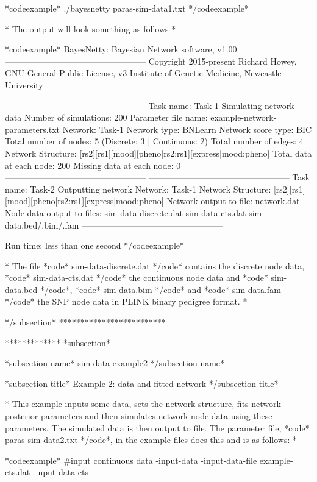 *codeexample* ./bayesnetty paras-sim-data1.txt */codeexample*

* The output will look something as follows *

*codeexample* BayesNetty: Bayesian Network software, v1.00 -------------------------------------------------- Copyright 2015-present Richard Howey, GNU General Public License, v3 Institute of Genetic Medicine, Newcastle University

-------------------------------------------------- Task name: Task-1 Simulating network data Number of simulations: 200 Parameter file name: example-network-parameters.txt Network: Task-1 Network type: BNLearn Network score type: BIC Total number of nodes: 5 (Discrete: 3 | Continuous: 2) Total number of edges: 4 Network Structure: [rs2][rs1][mood][pheno|rs2:rs1][express|mood:pheno] Total data at each node: 200 Missing data at each node: 0 -------------------------------------------------- -------------------------------------------------- Task name: Task-2 Outputting network Network: Task-1 Network Structure: [rs2][rs1][mood][pheno|rs2:rs1][express|mood:pheno] Network output to file: network.dat Node data output to files:
 sim-data-discrete.dat
 sim-data-cts.dat
 sim-data.bed/.bim/.fam
--------------------------------------------------

Run time: less than one second */codeexample*

* The file *code* sim-data-discrete.dat */code* contains the discrete node data, *code* sim-data-cts.dat */code* the continuous node data and *code* sim-data.bed */code*, *code* sim-data.bim */code* and *code* sim-data.fam */code* the SNP node data in PLINK binary pedigree format. *

*/subsection* *************************

************* *subsection*

*subsection-name* sim-data-example2 */subsection-name*

*subsection-title* Example 2: data and fitted network */subsection-title*

* This example inputs some data, sets the network structure, fits network posterior parameters and then simulates network node data using these parameters. The simulated data is then output to file. The parameter file, *code* paras-sim-data2.txt */code*, in the example files does this and is as follows: *

*codeexample* #input continuous data -input-data -input-data-file example-cts.dat -input-data-cts

